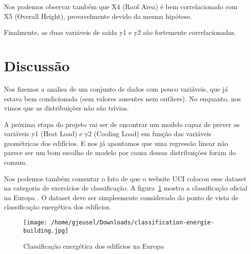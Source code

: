 \documentclass[paper=a4, fontsize=11pt]{article} %
\numberwithin{equation}{section} %
\numberwithin{figure}{section} %
\numberwithin{table}{section} %
\begin{document}
Nos podemos observar também que X4 (Roof Area) é bem correlacionado com X5 (Overall Height), provavelmente devido da mesma hipótese.

Finalmente, as duas variáveis de saída y1 e y2 são fortemente correlacionadas.


\section{Discussão}

Nos fizemos a analisa de um conjunto de dados com pouco variáveis, que já estava bem condicionada (sem valores ausentes nem outliers).
No enquanto, nos vimos que as distribuições não são trívias.

A próxima etapa do projeto vai ser de encontrar um modelo capaz de prever as variáveis y1 (Heat Load) e y2 (Cooling Load) em função das variáveis geométricas dos edifícios.
E nos já apontamos que uma regressão linear não parece ser um bom escolho de modelo por causa dessas distribuições foram do comum.

Nos podemos também comentar o fato de que o website UCI colocou esse dataset na categoria de exercícios de classificação.
A figura~\ref{energy_class_buildings} mostra a classificação oficial na Europa \cite{ref_class_energ}.
O dataset deve ser simplesmente considerado do ponto de vista de classificação energética dos edifícios.

\begin{figure}[H] %
\begin{center}
\texttt{[image: /home/gjeusel/Downloads/classification-energie-building.jpg]}
\end{center}
\caption{Classificação energética dos edifícios na Europa}
\label{energy_class_buildings}
\end{figure}

\newpage
\listoftables
\listoffigures

\newpage
\end{document}
